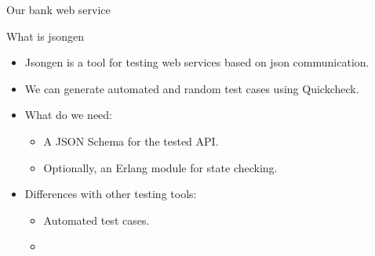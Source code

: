 \begin{frame}{Our bank web service}
  \begin{figure}
    \centering
    \begin{overprint}[\textwidth]
  \end{overprint}
  \end{figure}
\end{frame}

\begin{frame}{What is jsongen}

  \begin{itemize}
  \item Jsongen is a tool for testing web services based on json
    communication.

  \item We can generate automated and random test cases using
    Quickcheck.

  \item What do we need:
    \begin{itemize}
    \item A JSON Schema for the tested API.\@
    \item Optionally, an Erlang module for state checking.
    \end{itemize}

  \item Differences with other testing tools:
    \begin{itemize}
    \item Automated test cases.
    \item
    \end{itemize}

  \end{itemize}

\end{frame}